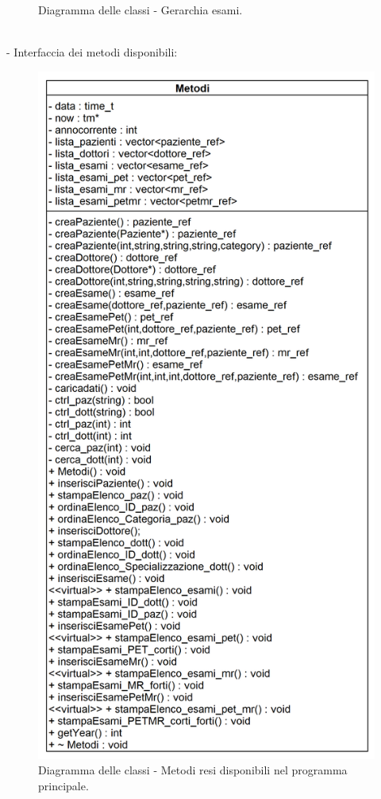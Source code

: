 \documentclass[a4paper,12pt]{article}
\begin{document}
{\begin{figure}[h]
 \caption{Diagramma delle classi - Gerarchia esami.}
\end{figure}
\\
\newpage
- Interfaccia dei metodi disponibili:
\begin{figure}[h]
 \centering
 \includegraphics[height=0.73\textheight]{diagrammiClassi/metodi}
 \caption{Diagramma delle classi - Metodi resi disponibili nel programma principale.}
\end{figure}


}
\end{document}
